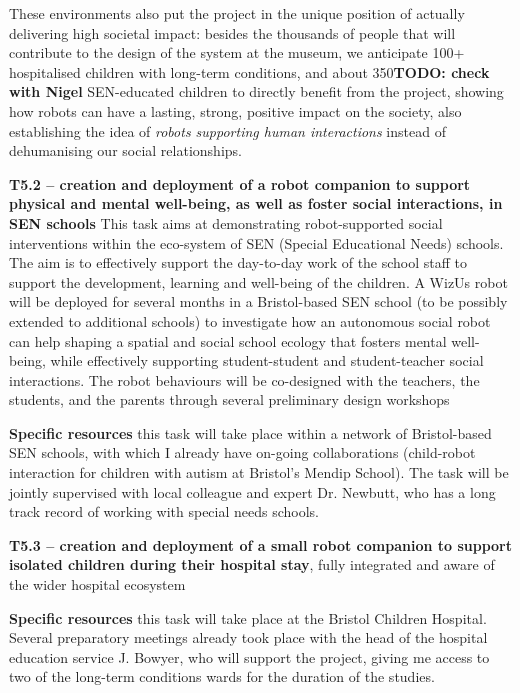 \documentclass[11pt,a4paper]{report}
\newcommand{\project}{WizUs\xspace}
\newcommand{\TODO}[1]{{\color{red}\textbf{TODO: #1}}}
\begin{document}
These environments also put the project in the unique position of actually
delivering high societal impact: besides the thousands of people that will
contribute to the design of the system at the museum, we anticipate 100+
hospitalised children with long-term conditions, and about 350\TODO{check with
Nigel} SEN-educated children to directly benefit from the project, showing how
robots can have a lasting, strong, positive impact on the society, also
establishing the idea of \emph{robots supporting human interactions} instead of
dehumanising our social relationships.

\textbf{T5.2 -- creation and deployment of a robot companion to
support physical and mental well-being, as well as foster social interactions,
in SEN schools} This task aims at demonstrating robot-supported social
interventions within the eco-system of SEN (Special Educational Needs)
schools. The aim is to effectively support the day-to-day work of the
school staff to support the development, learning and well-being of the
children. A \project robot will be deployed for several months in a
Bristol-based SEN school (to be possibly extended to additional schools) to
investigate how an autonomous social robot can help shaping a spatial and social
school ecology that fosters mental well-being, while effectively supporting
student-student and student-teacher social interactions. The
robot behaviours will be co-designed with the teachers, the students, and the
parents through several preliminary design workshops

\textbf{Specific resources} this task will take place within a network of
Bristol-based SEN schools, with which I already have on-going collaborations
(child-robot interaction for children with autism at Bristol's Mendip School).
The task will be jointly supervised with local colleague and expert Dr. Newbutt,
who has a long track record of working with special needs schools.


\textbf{T5.3 -- creation and deployment of a small robot companion to support
isolated children during their hospital stay}, fully integrated and aware of the
wider hospital ecosystem


\textbf{Specific resources} this task will take place at the Bristol Children
Hospital. Several preparatory meetings already took place with the head of the
hospital education service J. Bowyer, who will support the project, giving me
access to two of the long-term conditions wards for the duration of the studies.
\end{document}
